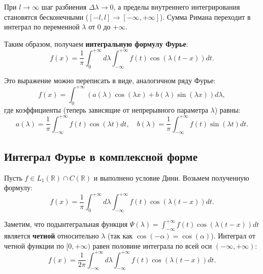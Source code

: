\documentclass[12pt,a4paper,openany]{book}
\begin{document}
При $l \to \infty$ шаг разбиения $\Delta \lambda \to 0$, а пределы внутреннего интегрирования становятся бесконечными ($[-l, l] \to [-\infty, +\infty]$). Сумма Римана переходит в интеграл по переменной $\lambda$ от $0$ до $+\infty$.

Таким образом, получаем \textbf{интегральную формулу Фурье}:
\begin{equation}
    f(x) = \frac{1}{\pi} \int_{0}^{+\infty} d\lambda \int_{-\infty}^{+\infty} f(t) \cos(\lambda(t-x)) dt.
\end{equation}

Это выражение можно переписать в виде, аналогичном ряду Фурье:
\begin{equation}
    f(x) = \int_{0}^{+\infty} \left( a(\lambda) \cos(\lambda x) + b(\lambda) \sin(\lambda x) \right) d\lambda,
\end{equation}
где коэффициенты (теперь зависящие от непрерывного параметра $\lambda$) равны:
$$
a(\lambda) = \frac{1}{\pi} \int_{-\infty}^{+\infty} f(t) \cos(\lambda t) dt, \quad
b(\lambda) = \frac{1}{\pi} \int_{-\infty}^{+\infty} f(t) \sin(\lambda t) dt.
$$

\subsection{ Интеграл Фурье в комплексной форме}

Пусть $f \in L_1(\mathbb{R}) \cap C(\mathbb{R})$ и выполнено условие Дини.
Возьмем полученную формулу:
$$
f(x) = \frac{1}{\pi} \int_{0}^{+\infty} d\lambda \int_{-\infty}^{+\infty} f(t) \cos(\lambda(t-x)) dt.
$$

Заметим, что подынтегральная функция $\Psi(\lambda) = \int_{-\infty}^{+\infty} f(t) \cos(\lambda(t-x)) dt$ является \textbf{четной} относительно $\lambda$ (так как $\cos(-\alpha) = \cos(\alpha)$).
Интеграл от четной функции по $[0, +\infty)$ равен половине интеграла по всей оси $(-\infty, +\infty)$:
$$
f(x) = \frac{1}{2\pi} \int_{-\infty}^{+\infty} d\lambda \int_{-\infty}^{+\infty} f(t) \cos(\lambda(t-x)) dt.
$$
\end{document}
